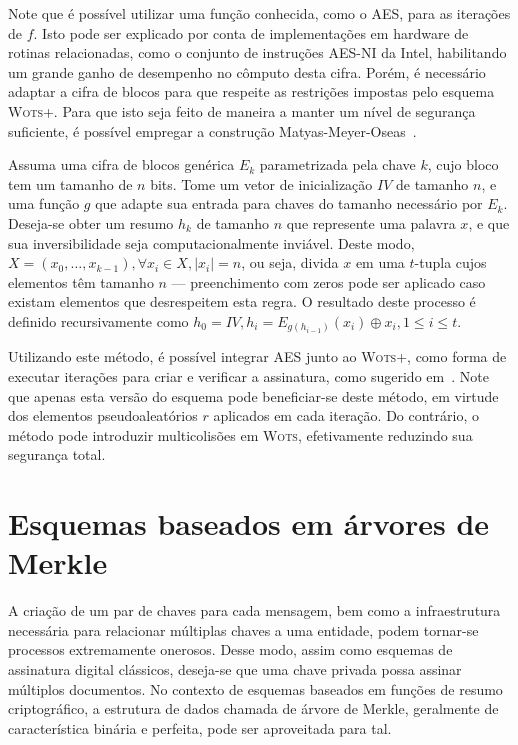 \documentclass[12pt]{report}
\begin{document}
Note que é possível utilizar uma função conhecida, como o AES, para as iterações de $f$. Isto pode ser explicado por conta de implementações em hardware de rotinas relacionadas, como o conjunto de instruções AES-NI da Intel, habilitando um grande ganho de desempenho no cômputo desta cifra. Porém, é necessário adaptar a cifra de blocos para que respeite as restrições impostas pelo esquema \textsc{Wots+}. Para que isto seja feito de maneira a manter um nível de segurança suficiente, é possível empregar a construção Matyas-Meyer-Oseas~\cite[9.41]{Menezes:1996:HAC:548089}.

Assuma uma cifra de blocos genérica $E_{k}$ parametrizada pela chave $k$, cujo bloco tem um tamanho de $n$ bits. Tome um vetor de inicialização $IV$ de tamanho $n$, e uma função $g$ que adapte sua entrada para chaves do tamanho necessário por $E_{k}$. Deseja-se obter um resumo $h_k$ de tamanho $n$ que represente uma palavra $x$, e que sua inversibilidade seja computacionalmente inviável. Deste modo, $X = (x_0, \dots, x_{k - 1}), \forall x_i \in X, \vert x_i \vert = n$, ou seja, divida $x$ em uma $t$-tupla cujos elementos têm tamanho $n$ --- preenchimento com zeros pode ser aplicado caso existam elementos que desrespeitem esta regra. O resultado deste processo é definido recursivamente como $h_0 = IV, h_i = E_{g(h_{i-1})}(x_i) \oplus x_i, 1 \leq i \leq t$.

Utilizando este método, é possível integrar AES junto ao \textsc{Wots+}, como forma de executar iterações para criar e verificar a assinatura, como sugerido em~\cite[4.1]{cryptoeprint:2017:965}. Note que apenas esta versão do esquema pode beneficiar-se deste método, em virtude dos elementos pseudoaleatórios $r$ aplicados em cada iteração. Do contrário, o método pode introduzir multicolisões em \textsc{Wots}, efetivamente reduzindo sua segurança total. %

\section{Esquemas baseados em árvores de Merkle}

A criação de um par de chaves para cada mensagem, bem como a infraestrutura necessária para relacionar múltiplas chaves a uma entidade, podem tornar-se processos extremamente onerosos. Desse modo, assim como esquemas de assinatura digital clássicos, deseja-se que uma chave privada possa assinar múltiplos documentos. No contexto de esquemas baseados em funções de resumo criptográfico, a estrutura de dados chamada de árvore de Merkle, geralmente de característica binária e perfeita, pode ser aproveitada para tal.
\end{document}
